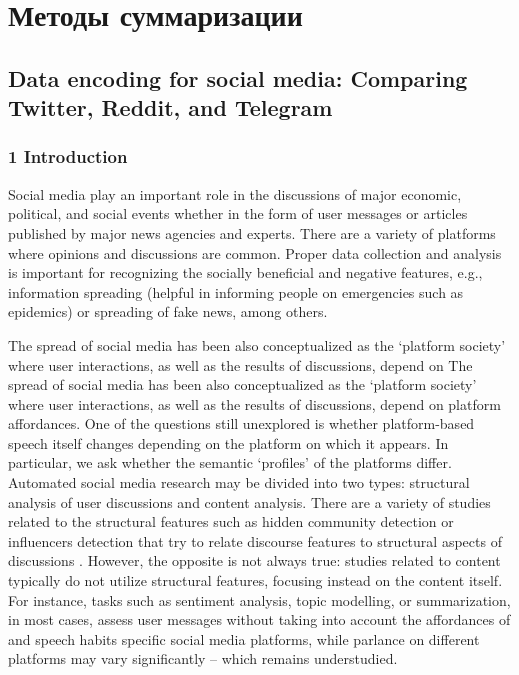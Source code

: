 \section{Методы суммаризации}\label{sec:ch5/sect4}

\subsection{Data encoding for social media: Comparing Twitter, Reddit, and Telegram}\label{subsec:ch5/sec4/sub1}

\subsubsection{1 Introduction}

Social media play an important role in the discussions of major economic, political, and social events whether in the form of user messages or articles published by major news agencies and experts. There are a variety of platforms where opinions and discussions are common. Proper data collection and analysis is important for recognizing the socially beneficial and negative features, e.g., information spreading (helpful in informing people on emergencies such as epidemics) or spreading of fake news, among others.

The spread of social media has been also conceptualized as the ‘platform society’ \cite{VanDijkPoellDeWall} where user interactions, as well as the results of discussions, depend on The spread of social media has been also conceptualized as the ‘platform society’ \cite{VanDijkPoellDeWall} where user interactions, as well as the results of discussions, depend on platform affordances. One of the questions still unexplored is whether platform-based speech itself changes depending on the platform on which it appears. In particular, we ask whether the semantic ‘profiles’ of the platforms differ. Automated social media research may be divided into two types: structural analysis of user discussions and content analysis. There are a variety of studies related to the structural features such as hidden community detection or influencers detection \cite{BlekanovBodrunovaAkhmetov} that try to relate discourse features to structural aspects of discussions \cite{BodrunovaBlekanovSmoliarova}. However, the opposite is not always true: studies related to content typically do not utilize structural features, focusing instead on the content itself. For instance, tasks such as sentiment analysis, topic modelling, or summarization, in most cases, assess user messages without taking into account the affordances of and speech habits specific social media platforms, while parlance on different platforms may vary significantly -- which remains understudied.

